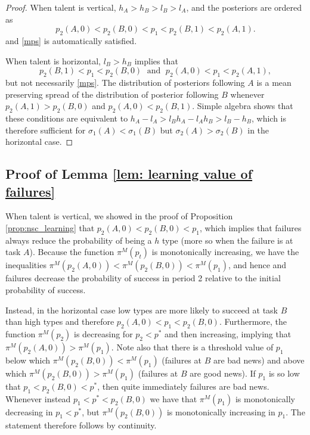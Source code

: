\documentclass[12pt,american]{paper}
\theoremstyle{remark}
\begin{document}
\begin{proof}
%
When talent is vertical, $h_A>h_B>l_B>l_A$, and
the posteriors are ordered as
\begin{equation*}
p_2(A,0)<p_2(B,0)<p_1<p_2(B,1)<p_2(A,1).
\end{equation*} 
and \eqref{mps} is automatically satisfied.

%
When talent is horizontal,  $l_B>h_B$ implies that 
\[  p_2(B,1)<p_1<p_2(B,0) \;\text{ and }\; p_2(A,0)<p_1<p_2(A,1), \]
but not necessarily \eqref{mps}. The distribution of posteriors following $A$ is a mean preserving spread of the distribution of posterior following $B$ whenever $p_2(A,1)>p_2(B,0)$ and $p_2(A,0)<p_2(B,1)$. Simple algebra shows that these conditions are equivalent to $h_A-l_A>l_Bh_A-l_Ah_B >l_B-h_B$, which is therefore sufficient for $\sigma_1(A)<\sigma_1(B)$ but $\sigma_2(A)>\sigma_2(B)$ in the horizontal case.
%

\end{proof}










\subsection*{Proof of Lemma \ref{lem: learning value of failures}}



When talent is vertical, we showed in the proof of Proposition \ref{prop:nsc_learning}  that $p_2(A,0)<p_2(B,0)<p_1$, which implies that failures always reduce the probability of being a $h$ type (more so when the failure is at task $A$). Because the function $\pi^M(p_t)$ is monotonically increasing, we have the inequalities $\pi^M(p_2(A,0))<\pi^M(p_2(B,0))<\pi^M(p_1)$, and hence and failures decrease the probability of success in period 2 relative to the initial probability of success.

 
Instead, in the horizontal case low types are more likely to succeed at task $B$ than high types and therefore $ p_2(A,0)<p_1<p_2(B,0)$. Furthermore, the function $\pi^M(p_2)$ is decreasing for $p_2<p^*$ and then increasing, implying that  $\pi^M(p_2(A,0))>\pi^M(p_1)$. Note also that there is a threshold value of $p_1$ below which $\pi^M(p_2(B,0))<\pi^M(p_1)$ (failures at $B$ are bad news) and above which  $\pi^M(p_2(B,0))>\pi^M(p_1)$ (failures at $B$ are good news). If $p_1$ is so low that  $p_1<p_2(B,0)<p^*$, then quite immediately failures are bad news. Whenever instead  $p_1<p^*<p_2(B,0)$ we have that $\pi^M(p_1)$ is monotonically decreasing in $p_1<p^*$, but $\pi^M(p_2(B,0))$ is monotonically increasing in $p_1$. The statement therefore follows by continuity.
\end{document}
